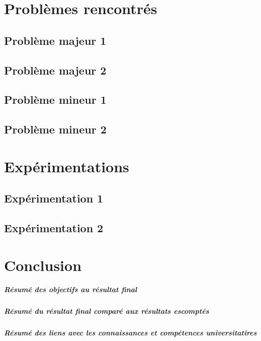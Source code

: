 \documentclass[
	headsepline=on,
	footsepline=on,
	twoside=off,
	abstract=on,
	DIV=10
]{scrreprt}
\begin{document}
		\chapter{Problèmes rencontrés}
		
			\section{Problème majeur 1}
			\section{Problème majeur 2}
			
			\section{Problème mineur 1}
			\section{Problème mineur 2}
				
		\chapter{Expérimentations}
			\section{Expérimentation 1}
			
			\section{Expérimentation 2}
			
			
		\chapter{Conclusion}
			\paragraph{Résumé des objectifs au résultat final}
			
			\paragraph{Résumé du résultat final comparé aux résultats escomptés}
			
			\paragraph{Résumé des liens avec les connaissances et compétences universitatires}
			
\end{document}
